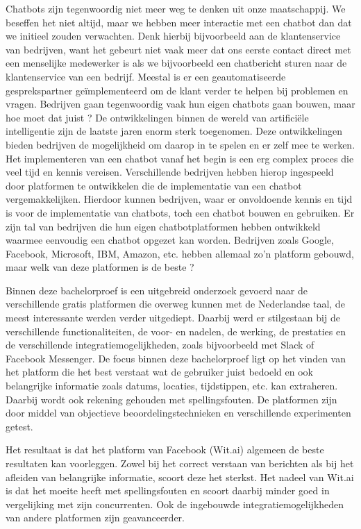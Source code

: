 Chatbots zijn tegenwoordig niet meer weg te denken uit onze maatschappij. We beseffen het niet altijd, maar we hebben meer interactie met een chatbot dan dat we initieel zouden verwachten. Denk hierbij bijvoorbeeld aan de klantenservice van bedrijven, want het gebeurt niet vaak meer dat ons eerste contact direct met een menselijke medewerker is als we bijvoorbeeld een chatbericht sturen naar de klantenservice van een bedrijf. Meestal is er een geautomatiseerde gesprekspartner geïmplementeerd om de klant verder te helpen bij problemen en vragen. Bedrijven gaan tegenwoordig vaak hun eigen chatbots gaan bouwen, maar hoe moet dat juist ? De ontwikkelingen binnen de wereld van artificiële intelligentie zijn de laatste jaren enorm sterk toegenomen. Deze ontwikkelingen bieden bedrijven de mogelijkheid om daarop in te spelen en er zelf mee te werken. Het implementeren van een chatbot vanaf het begin is een erg complex proces die veel tijd en kennis vereisen. Verschillende bedrijven hebben hierop ingespeeld door platformen te ontwikkelen die de implementatie van een chatbot vergemakkelijken. Hierdoor kunnen bedrijven, waar er onvoldoende kennis en tijd is voor de implementatie van chatbots, toch een chatbot bouwen en gebruiken. Er zijn tal van bedrijven die hun eigen chatbotplatformen hebben ontwikkeld waarmee eenvoudig een chatbot opgezet kan worden. Bedrijven zoals Google, Facebook, Microsoft, IBM, Amazon, etc. hebben allemaal zo’n platform gebouwd, maar welk van deze platformen is de beste ?

Binnen deze bachelorproef is een uitgebreid onderzoek gevoerd naar de verschillende gratis platformen die overweg kunnen met de Nederlandse taal, de meest interessante werden verder uitgediept. Daarbij werd er stilgestaan bij de verschillende functionaliteiten, de voor- en nadelen, de werking, de prestaties en de verschillende integratiemogelijkheden, zoals bijvoorbeeld met Slack of Facebook Messenger. De focus binnen deze bachelorproef ligt op het vinden van het platform die het best verstaat wat de gebruiker juist bedoeld en ook belangrijke informatie zoals datums, locaties, tijdstippen, etc. kan extraheren. Daarbij wordt ook rekening gehouden met spellingsfouten. De platformen zijn door middel van objectieve beoordelingstechnieken en verschillende experimenten getest. 

Het resultaat is dat het platform van Facebook (Wit.ai) algemeen de beste resultaten kan voorleggen. Zowel bij het correct verstaan van berichten als bij het afleiden van belangrijke informatie, scoort deze het sterkst. Het nadeel van Wit.ai is dat het moeite heeft met spellingsfouten en scoort daarbij minder goed in vergelijking met zijn concurrenten. Ook de ingebouwde integratiemogelijkheden van andere platformen zijn geavanceerder.

